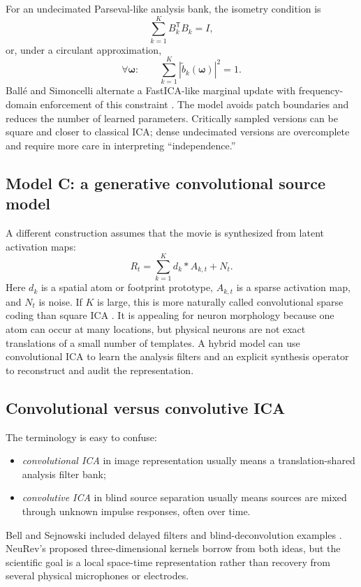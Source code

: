 \documentclass[11pt]{article}
\newcommand{\trans}{\mathsf T}
\newcommand{\conv}{\mathbin{*}}
\begin{document}
For an undecimated Parseval-like analysis bank, the isometry condition is
\begin{equation}
\sum_{k=1}^{K}B_k^{\trans}B_k=I,
\label{eq:isometry-spatial}
\end{equation}
or, under a circulant approximation,
\begin{equation}
\forall\bm\omega:\qquad
\sum_{k=1}^{K}
|\widetilde b_k(\bm\omega)|^2=1.
\label{eq:fourier-tight}
\end{equation}
Ball\'e and Simoncelli alternate a FastICA-like marginal update with
frequency-domain enforcement of this constraint
\cite{balle2014cica}. The model avoids patch boundaries and reduces the number
of learned parameters. Critically sampled versions can be square and closer to
classical ICA; dense undecimated versions are overcomplete and require more
care in interpreting ``independence.''

\subsection{Model C: a generative convolutional source model}

A different construction assumes that the movie is synthesized from latent
activation maps:
\begin{equation}
R_t
=
\sum_{k=1}^{K}d_k\conv A_{k,t}
+N_t.
\label{eq:conv-generative}
\end{equation}
Here $d_k$ is a spatial atom or footprint prototype, $A_{k,t}$ is a sparse
activation map, and $N_t$ is noise. If $K$ is large, this is more naturally
called convolutional sparse coding than square ICA
\cite{bristow2013csc}. It is appealing for neuron morphology because one atom
can occur at many locations, but physical neurons are not exact translations
of a small number of templates. A hybrid model can use convolutional ICA to
learn the analysis filters and an explicit synthesis operator to reconstruct
and audit the representation.

\subsection{Convolutional versus convolutive ICA}

The terminology is easy to confuse:
\begin{itemize}[leftmargin=*]
\item \emph{convolutional ICA} in image representation usually means a
translation-shared analysis filter bank;
\item \emph{convolutive ICA} in blind source separation usually means sources
are mixed through unknown impulse responses, often over time.
\end{itemize}
Bell and Sejnowski included delayed filters and blind-deconvolution examples
\cite{bell1995infomax}. NeuRev's proposed three-dimensional kernels borrow from
both ideas, but the scientific goal is a local space-time representation rather
than recovery from several physical microphones or electrodes.
\end{document}
